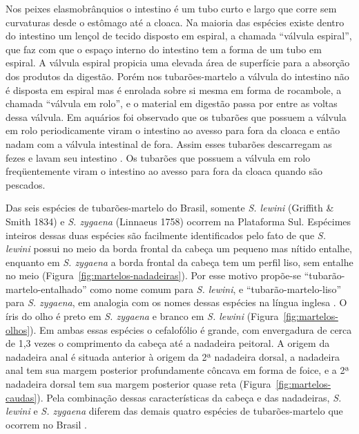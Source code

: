 \documentclass[a4paper,11pt,twoside,showtrims,onecolumn,openright,final]{memoir}
\begin{document}

Nos peixes elasmobrânquios o intestino é um tubo curto e largo que corre sem curvaturas desde 
o estômago até a cloaca. Na maioria das espécies existe dentro do intestino um lençol de tecido 
disposto em espiral, a chamada ``válvula espiral'', que faz com que o espaço interno do intestino 
tem a forma de um tubo em espiral. A válvula espiral propicia uma elevada área de superfície para 
a absorção dos produtos da digestão. Porém nos tubarões-martelo a válvula do intestino não é disposta 
em espiral mas é enrolada sobre si mesma em forma de rocambole, a chamada ``válvula em rolo'', 
e o material em digestão passa por entre as voltas dessa válvula. Em aquários foi observado que 
os tubarões que possuem a válvula em rolo periodicamente viram o intestino ao avesso para fora da 
cloaca e então nadam com a válvula intestinal de fora. Assim esses tubarões descarregam as fezes 
e lavam seu intestino  \citep{compagno1988}. %
Os tubarões que possuem a válvula em rolo freqüentemente viram o intestino ao avesso para 
fora  da cloaca quando são pescados.

Das seis espécies de tubarões-martelo do Brasil, somente \emph{S. lewini} (Griffith \& Smith 1834) 
e \emph{S. zygaena} (Linnaeus 1758) ocorrem na Plataforma Sul. Espécimes inteiros dessas duas espécies 
são facilmente identificados pelo fato de que \emph{S. lewini} possui no meio da borda frontal da cabeça 
um pequeno mas nítido entalhe, enquanto em \emph{S. zygaena} a borda frontal da cabeça tem um perfil liso, 
sem entalhe no meio (Figura~\ref{fig:martelos-nadadeiras}).
Por esse motivo propõe-se ``tubarão-martelo-entalhado'' como nome comum para \emph{S. lewini}, 
e ``tubarão-martelo-liso'' para \emph{S. zygaena}, em analogia com os nomes dessas espécies 
na língua inglesa \citep{COMPAGNO1984B}. %
O íris do olho é preto em \emph{S. zygaena} e branco em \emph{S. lewini} (Figura~\ref{fig:martelos-olhos}).
Em ambas essas espécies o cefalofólio é grande, com envergadura de cerca de 1,3 vezes 
o comprimento da cabeça até a nadadeira peitoral.  A origem da nadadeira anal é situada 
anterior à origem da 2ª nadadeira dorsal, a nadadeira anal tem sua margem posterior profundamente 
côncava em forma de foice, e a 2ª nadadeira dorsal tem sua margem posterior quase reta (Figura~\ref{fig:martelos-caudas}).
Pela combinação dessas características da cabeça e das nadadeiras, \emph{S. lewini} e \emph{S. zygaena} 
diferem das demais quatro espécies de tubarões-martelo que ocorrem 
no Brasil \citep{gilbert1967,FIGUEIREDO1977,COMPAGNO1984B,vooren1997,soto2001a}. %
\end{document}
